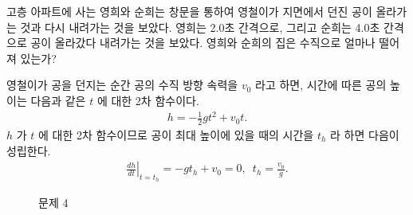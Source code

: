 \documentclass[floatfix,nofootinbib,superscriptaddress,fleqn,preprint]{revtex4}
\begin{document}




 고층 아파트에 사는 영희와 순희는 창문을 통하여 
영철이가 지면에서 던진 공이 올라가는 것과 다시 내려가는 것을 보았다. 
영희는 2.0초 간격으로, 그리고 순희는 4.0초 간격으로 공이 올라갔다 
내려가는 것을 보았다. 영희와 순희의 집은 수직으로 얼마나 떨어져 있는가?

\vspace{1cm}

영철이가 공을 던지는 순간 공의 수직 방향 속력을 $v_0$ 라고 하면, 
시간에 따른 공의 높이는 다음과 같은 $t$ 에 대한 2차 함수이다.
\begin{align}
  h = -\frac{1}{2}gt^2+v_0t.
\end{align} $h$ 가 $t$ 에 대한 2차 함수이므로
 공이 최대 높이에 있을 때의 시간을 $t_h$ 라 하면 다음이 성립한다.
\begin{align}\label{eq:4.1}
  \left.\frac{dh}{dt}\right|_{t=t_h} 
  = -gt_h+v_0=0,\,\,\,t_h=\frac{v_0}{g}.
\end{align}

\begin{figure}[htbp]
  \centering
  \caption{ 문제 4}
  \label{pic:10}
\end{figure}
\end{document}

